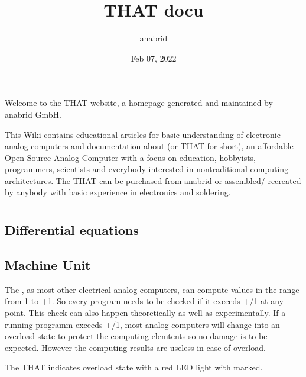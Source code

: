 \documentclass[letterpaper,10pt,english]{sphinxmanual}
\title{THAT docu}
\date{Feb 07, 2022}
\author{anabrid}
\let\sphinxpxdimen\pdfpxdimen\else\newdimen\sphinxpxdimen
\begin{document}
\pagestyle{empty}
\sphinxmaketitle
\pagestyle{plain}
\sphinxtableofcontents
\pagestyle{normal}
\label{\detokenize{index::doc}}


\sphinxAtStartPar
Welcome to the THAT website, a homepage generated and maintained by anabrid GmbH.

\noindent{\hspace*{\fill}\sphinxincludegraphics[width=400\sphinxpxdimen]{{THAT_front01}.jpg}}

\sphinxAtStartPar
This Wiki contains educational articles for basic understanding of electronic analog computers and documentation about  (or THAT for short), an affordable Open Source Analog Computer with a focus on education, hobbyists, programmers, scientists and everybody interested in non\sphinxhyphen{}traditional computing architectures. The THAT can be purchased from anabrid or assembled/ recreated by anybody with basic experience in electronics and soldering.


\chapter{}
\label{\detokenize{index:basics}}

\section{Differential equations}
\label{\detokenize{rst/basics_differential_equations:differential-equations}}\label{\detokenize{rst/basics_differential_equations::doc}}

\section{Machine Unit}
\label{\detokenize{rst/basics_machine_unit:machine-unit}}\label{\detokenize{rst/basics_machine_unit::doc}}
\sphinxAtStartPar
The , as most other electrical analog computers, can compute values in the range from \sphinxhyphen{}1 to +1. So every program needs to be checked if it exceeds +/\sphinxhyphen{}1 at any point. This check can also happen theoretically as well as experimentally. If a running programm exceeds +/\sphinxhyphen{}1, most analog computers will change into an overload state to protect the computing elemtents so no damage is to be expected. However the computing results are useless in case of overload.

\sphinxAtStartPar
The THAT indicates overload state with a red LED light with  marked.
\end{document}
